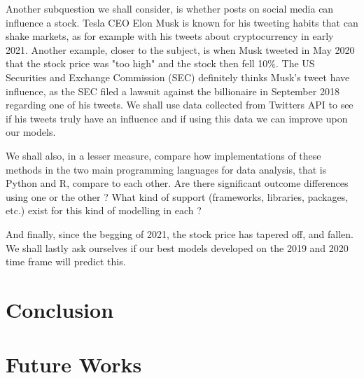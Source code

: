 \documentclass[10pt]{report}
\begin{document}
Another subquestion we shall consider, is whether posts on social media can influence a stock.
Tesla CEO Elon Musk is known for his tweeting habits that can shake markets, as for example with his tweets about cryptocurrency in early 2021. Another example, closer to the subject, is when Musk tweeted in May 2020 that the stock price was "too high" and the stock then fell 10$\%$. The US Securities and Exchange Commission (SEC) definitely thinks Musk's tweet have influence, as the SEC filed a lawsuit against the billionaire in September 2018 regarding one of his tweets. We shall use data collected from Twitters API to see if his tweets truly have an influence and if using this data we can improve upon our models.


We shall also, in a lesser measure, compare how implementations of these methods in the two main programming languages for data analysis, that is Python and R, compare to each other. Are there significant outcome differences using one or the other ? What kind of support (frameworks, libraries, packages, etc.) exist for this kind of modelling in each ?

And finally, since the begging of 2021, the stock price has tapered off, and fallen. We shall lastly ask ourselves if our best models developed on the 2019 and 2020 time frame will predict this.











\chapter{Conclusion}

\chapter{Future Works}


\printglossary[type=\acronymtype]
\printglossary
\end{document}
